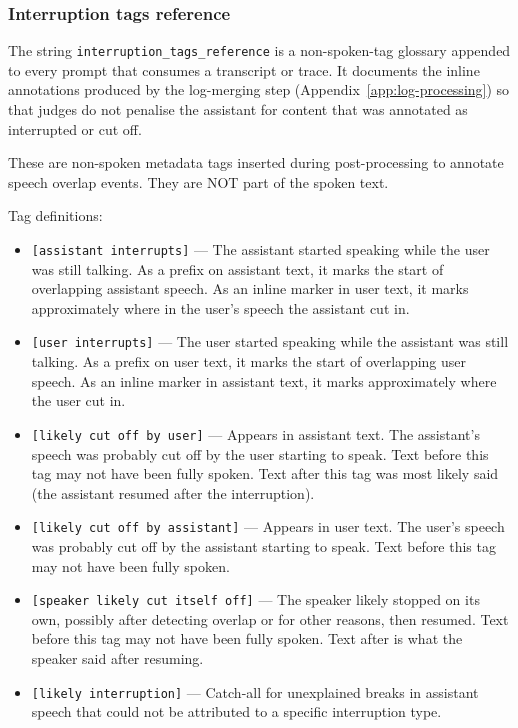 \subsubsection{Interruption tags reference}
\label{app:prompt-shared-interruption-tags}

The string \texttt{interruption\_tags\_reference} is a non-spoken-tag glossary appended to every prompt that consumes a transcript or trace. It documents the inline annotations produced by the log-merging step (Appendix~\ref{app:log-processing}) so that judges do not penalise the assistant for content that was annotated as interrupted or cut off.

\begin{tcolorbox}[promptbox, title={\small \texttt{interruption\_tags\_reference}}]
These are non-spoken metadata tags inserted during post-processing to annotate speech overlap events. They are NOT part of the spoken text.\newline

Tag definitions:
\begin{itemize}
    \item \texttt{[assistant interrupts]} --- The assistant started speaking while the user was still talking. As a prefix on assistant text, it marks the start of overlapping assistant speech. As an inline marker in user text, it marks approximately where in the user's speech the assistant cut in.
    \item \texttt{[user interrupts]} --- The user started speaking while the assistant was still talking. As a prefix on user text, it marks the start of overlapping user speech. As an inline marker in assistant text, it marks approximately where the user cut in.
    \item \texttt{[likely cut off by user]} --- Appears in assistant text. The assistant's speech was probably cut off by the user starting to speak. Text before this tag may not have been fully spoken. Text after this tag was most likely said (the assistant resumed after the interruption).
    \item \texttt{[likely cut off by assistant]} --- Appears in user text. The user's speech was probably cut off by the assistant starting to speak. Text before this tag may not have been fully spoken.
    \item \texttt{[speaker likely cut itself off]} --- The speaker likely stopped on its own, possibly after detecting overlap or for other reasons, then resumed. Text before this tag may not have been fully spoken. Text after is what the speaker said after resuming.
    \item \texttt{[likely interruption]} --- Catch-all for unexplained breaks in assistant speech that could not be attributed to a specific interruption type.
\end{itemize}
\end{tcolorbox}

